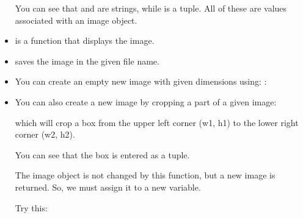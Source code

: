 \documentclass[letterpaper,10pt,english]{sphinxmanual}
\begin{document}
\begin{itemize}
You can see that  and  are strings, while
 is a tuple. All of these are values associated with an
image object.

\item {} 
 is a function that displays the image.

\item {} 
 saves the image in the given file name.

\item {} 
You can create an empty new image with given dimensions using:
:

\begin{sphinxVerbatim}[commandchars=\\\{\}]
    
\end{sphinxVerbatim}

\item {} 
You can also create a new image by cropping a part of a given
image:

\begin{sphinxVerbatim}[commandchars=\\\{\}]
   
\end{sphinxVerbatim}

which will crop a box from the upper left corner (w1, h1) to the lower
right corner (w2, h2).

You can see that the box is entered as a tuple.

The image object  is not changed by this function, but a
new image is returned. So, we must assign it to a new variable.

Try this:

\begin{sphinxVerbatim}[commandchars=\\\{\}]
     
\end{sphinxVerbatim}


\end{itemize}
\end{document}
